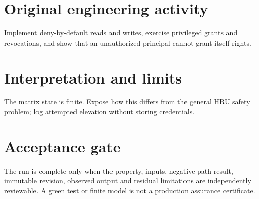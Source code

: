 \documentclass[10pt,letterpaper]{article}
\begin{document}
\section{Original engineering activity}
Implement deny-by-default reads and writes, exercise privileged grants and revocations, and show that an unauthorized principal cannot grant itself rights.
\section{Interpretation and limits}
The matrix state is finite. Expose how this differs from the general HRU safety problem; log attempted elevation without storing credentials.
\section{Acceptance gate}
The run is complete only when the property, inputs, negative-path result, immutable revision, observed output and residual limitations are independently reviewable. A green test or finite model is not a production assurance certificate.
\end{document}
